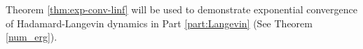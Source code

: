\documentclass[11pt, twoside]{report}
\begin{document}
Theorem \ref{thm:exp-conv-linf} will be used to demonstrate exponential convergence of Hadamard-Langevin dynamics in Part \ref{part:Langevin} (See Theorem \ref{num_erg}).

\end{document}

